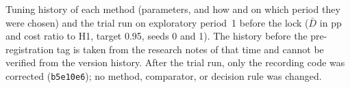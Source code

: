 \begin{table}[!htbp]
\centering
\caption{Tuning history of each method (parameters, and how and on which period
they were chosen) and the trial run on exploratory period~1 before the lock
($\bar{D}$ in pp and cost ratio to H1, target 0.95, seeds 0 and 1). The history
before the pre-registration tag is taken from the research notes of that time
and cannot be verified from the version history. After the trial run, only the
recording code was corrected (\texttt{b5e10e6}); no method, comparator, or
decision rule was changed.}
\label{tab:c2_tuning}
\footnotesize
{}
\end{table}
